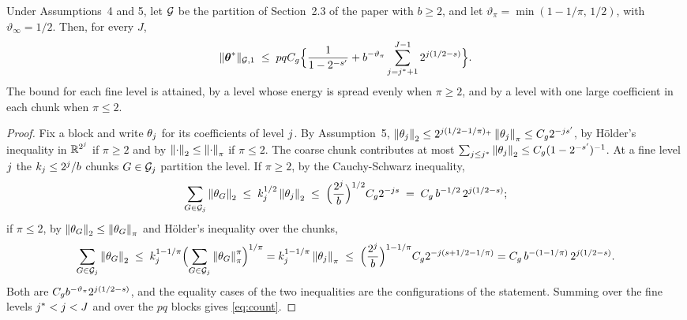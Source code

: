 
\begin{lemma}
\label{lem:count}
Under Assumptions~4 and 5, let $\mathcal{G}$ be the partition of Section~2.3 of the
paper with $b \ge 2$, and let $\vartheta_{\pi} = \min(1-1/\pi,\,1/2)$, with
$\vartheta_{\infty} = 1/2$. Then, for every $J$,
\begin{equation}
  \label{eq:count}
  \lVert \boldsymbol{\theta}^{*}\rVert_{\mathcal{G},1} \;\le\; pqC_g\Bigl\{\frac{1}{1-2^{-s'}}
  + b^{-\vartheta_{\pi}}\sum_{j=j^{*}+1}^{J-1}2^{j(1/2-s)}\Bigr\}.
\end{equation}
The bound for each fine level is attained, by a level whose energy is spread
evenly when $\pi \ge 2$, and by a level with one large coefficient in each
chunk when $\pi \le 2$.
\end{lemma}

\begin{proof}
Fix a block and write $\theta_{j}$ for its coefficients of level $j$.
By Assumption~5, $\left\lVert \theta_{j} \right\rVert_{2} \le
2^{j(1/2-1/\pi)_{+}}\left\lVert \theta_{j} \right\rVert_{\pi} \le C_g2^{-js'}$, by
Hölder's inequality in $\mathbb{R}^{2^{j}}$ if $\pi \ge 2$ and by
$\left\lVert \cdot \right\rVert_{2} \le \left\lVert \cdot \right\rVert_{\pi}$ if $\pi \le 2$. The coarse chunk
contributes at most $\sum_{j\le j^{*}}\left\lVert \theta_{j} \right\rVert_{2} \le
C_g(1-2^{-s'})^{-1}$. At a fine level $j$ the $k_{j} \le 2^{j}/b$
chunks $G \in \mathcal{G}_{j}$ partition the level. If $\pi \ge 2$, by the
Cauchy-Schwarz inequality,
\[
  \sum_{G\in\mathcal{G}_{j}}\left\lVert \theta_{G} \right\rVert_{2}
  \;\le\; k_{j}^{1/2}\left\lVert \theta_{j} \right\rVert_{2}
  \;\le\; \Bigl(\frac{2^{j}}{b}\Bigr)^{1/2}C_g2^{-j s}
  \;=\; C_g\,b^{-1/2}\,2^{j(1/2-s)} ;
\]
if $\pi \le 2$, by $\left\lVert \theta_{G} \right\rVert_{2} \le \left\lVert \theta_{G} \right\rVert_{\pi}$ and
Hölder's inequality over the chunks,
\[
  \sum_{G\in\mathcal{G}_{j}}\left\lVert \theta_{G} \right\rVert_{2}
  \;\le\; k_{j}^{1-1/\pi}\Bigl(\sum_{G\in\mathcal{G}_{j}}
  \left\lVert \theta_{G} \right\rVert_{\pi}^{\pi}\Bigr)^{1/\pi}
  = k_{j}^{1-1/\pi}\left\lVert \theta_{j} \right\rVert_{\pi}
  \;\le\; \Bigl(\frac{2^{j}}{b}\Bigr)^{1-1/\pi}C_g2^{-j(s+1/2-1/\pi)}
  = C_g\,b^{-(1-1/\pi)}\,2^{j(1/2-s)} .
\]
Both are $C_gb^{-\vartheta_{\pi}}2^{j(1/2-s)}$, and the equality cases of
the two inequalities are the configurations of the statement. Summing over the
fine levels $j^{*} < j < J$ and over the $pq$ blocks gives \eqref{eq:count}.
\end{proof}

